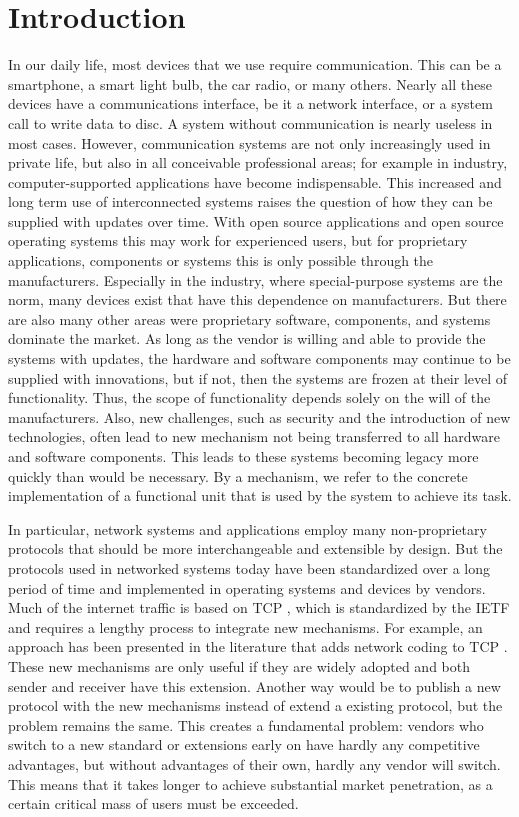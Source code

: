 \section{Introduction}
\label{sec:intro}

In our daily life, most devices that we use require communication. 
This can be a smartphone, a smart light bulb, the car radio, or many others.
Nearly all these devices have a communications interface, be it a network interface, or a system call to write data to disc. 
A system without communication is nearly useless in most cases. 
However, communication systems are not only increasingly used in private life, but also in all conceivable professional areas; for example in industry, computer-supported applications have become indispensable.  
This increased and long term use of interconnected systems raises the question of how they can be supplied with updates over time. 
With open source applications and open source operating systems this may work for experienced users, but for proprietary applications, components or systems this is only possible through the manufacturers.
Especially in the industry, where special-purpose systems are the norm, many devices exist that have this dependence on manufacturers. 
But there are also many other areas were proprietary software, components, and systems dominate the market.
As long as the vendor is willing and able to provide the systems with updates, the hardware and software components may continue to be supplied with innovations, but if not, then the systems are frozen at their level of functionality. 
Thus, the scope of functionality depends solely on the will of the manufacturers.
Also, new challenges, such as security and the introduction of new technologies, often lead to new mechanism not being transferred to all hardware and software components. 
This leads to these systems becoming legacy more quickly than would be necessary. 
By a mechanism, we refer to the concrete implementation of a functional unit that is used by the system to achieve its task. 

In particular, network systems and applications employ many non-proprietary protocols that should be more interchangeable and extensible by design. 
But the protocols used in networked systems today have been standardized over a long period of time and implemented in operating systems and devices by vendors.
Much of the internet traffic is based on TCP  \cite{A3:john2007analysis}, which is standardized by the IETF and requires a lengthy process to integrate new mechanisms\cite{A3:de2019pluginizing}. 
For example, an approach has been presented in the literature that adds network coding to TCP \cite{A3:sundararajan2011network}. 
These new mechanisms are only useful if they are widely adopted and both sender and receiver have this extension. 
Another way would be to publish a new protocol with the new mechanisms instead of extend a existing protocol, but the problem remains the same. 
This creates a fundamental problem: vendors who switch to a new standard or extensions early on have hardly any competitive advantages, but without advantages of their own, hardly any vendor will switch.
This means that it takes longer to achieve substantial market penetration, as a certain critical mass of users must be exceeded. 

